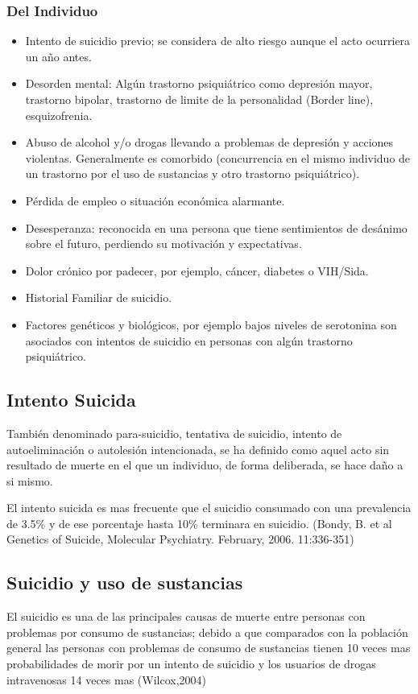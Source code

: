 {{\subsubsection{Del Individuo}
{
\begin{itemize}
\item Intento de suicidio previo; se considera de alto riesgo aunque el acto ocurriera un año antes.
\item Desorden mental: Algún trastorno psiquiátrico como depresión mayor, trastorno bipolar, trastorno de limite de la personalidad (Border line), esquizofrenia.
\item Abuso de alcohol y/o drogas llevando a problemas de depresión y acciones violentas. Generalmente es comorbido (concurrencia en el mismo individuo de un trastorno por el uso de sustancias y otro trastorno psiquiátrico).
\item Pérdida de empleo o situación económica alarmante.
\item Desesperanza: reconocida en una persona que tiene sentimientos de desánimo sobre el futuro, perdiendo su motivación y expectativas.
\item Dolor crónico por padecer, por ejemplo, cáncer, diabetes o VIH/Sida.
\item Historial Familiar de suicidio.
\item Factores genéticos y biológicos, por ejemplo bajos niveles de serotonina son asociados con intentos de suicidio en personas con algún trastorno psiquiátrico.
\end{itemize}
}}
\subsection{Intento Suicida}
{
También denominado para-suicidio, tentativa de suicidio, intento de autoeliminación o autolesión intencionada, se ha definido como aquel acto sin resultado de muerte en el que un individuo, de forma deliberada, se hace daño a si mismo.

El intento suicida es mas frecuente que el suicidio consumado con una prevalencia de 3.5\% y de ese porcentaje hasta 10\% terminara en suicidio.  (Bondy, B. et al Genetics of Suicide, Molecular Psychiatry. February, 2006. 11:336-351)
}
\subsection{Suicidio y uso de sustancias}
{
El suicidio es una de las principales causas de muerte entre personas con problemas por consumo de sustancias; debido a que comparados con la población general las personas con problemas de consumo de sustancias tienen 10 veces mas probabilidades de morir por un intento de suicidio y los usuarios de drogas intravenosas 14 veces mas (Wilcox,2004)\\

}}
